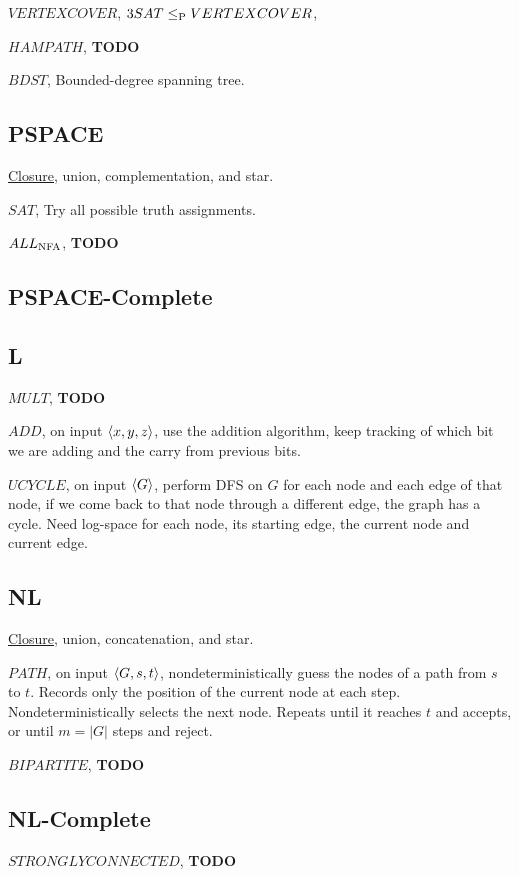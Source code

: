 \hyperref[lang:VERTEXCOVER_NPC]{$VERTEXCOVER$}, $3SAT \leq_\P VERTEXCOVER$,

\hyperref[lang:HAMPATH_NPC]{$HAMPATH$}, \textbf{TODO}

\hyperref[lang:UHAMPATH_BDST]{$BDST$}, Bounded-degree spanning tree.
\subsection{PSPACE}

\hyperref[exe:PSPACE_CLOSURE]{Closure}, union, complementation, and star.

\hyperref[lang:SAT_PSAPCE]{$SAT$}, Try all possible truth assignments.

\hyperref[lang:ALLNFA_PSAPCE]{$ALL_\NFA$}, \textbf{TODO}

\subsection{PSPACE-Complete}

\subsection{L}

\hyperref[lang:MULT_L]{$MULT$}, \textbf{TODO}

\hyperref[lang:ADD_L]{$ADD$}, on input $\desc{x, y, z}$, use the addition algorithm, keep tracking of which bit we are adding and the carry from previous bits.

\hyperref[lang:UCYCLE_L]{$UCYCLE$}, on input $\desc{G}$, perform DFS on $G$ for each node and each edge of that node, if we come back to that node through a different edge, the graph has a cycle. Need log-space for each node, its starting edge, the current node and current edge.
\subsection{NL}

\hyperref[exe:NL_CLOSURE]{Closure}, union, concatenation, and star.

\hyperref[lang:PATH_NL]{$PATH$}, on input $\desc{G, s, t}$, nondeterministically guess the nodes of a path from $s$ to $t$. Records only the position of the current node at each step. Nondeterministically selects the next node. Repeats until it reaches $t$ and accepts, or until $m=|G|$ steps and reject.

\hyperref[lang:BIPARTITE_NL]{$BIPARTITE$}, \textbf{TODO}

\subsection{NL-Complete}

\hyperref[lang:STRCON_NLC]{$STRONGLYCONNECTED$}, \textbf{TODO}